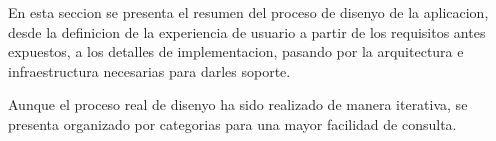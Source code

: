 
En esta seccion se presenta el resumen del proceso de disenyo de la aplicacion, desde la definicion de la experiencia de usuario a partir de los requisitos antes expuestos, a los detalles de implementacion, pasando por la arquitectura e infraestructura necesarias para darles soporte.

Aunque el proceso real de disenyo ha sido realizado de manera iterativa, se presenta organizado por categorias para una mayor facilidad de consulta.
